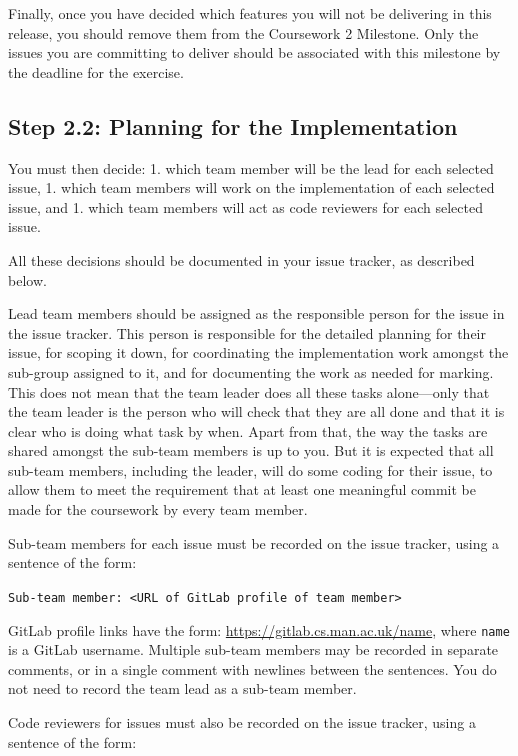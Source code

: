 \documentclass[
]{book}
\begin{document}
Finally, once you have decided which features you will not be delivering in this release, you should remove them from the Coursework 2 Milestone. Only the issues you are committing to deliver should be associated with this milestone by the deadline for the exercise.

\hypertarget{plimp}{%
\subsection{Step 2.2: Planning for the Implementation}\label{plimp}}

You must then decide:
1. which team member will be the lead for each selected issue,
1. which team members will work on the implementation of each selected issue, and
1. which team members will act as code reviewers for each selected issue.

All these decisions should be documented in your issue tracker, as described below.

Lead team members should be assigned as the responsible person for the issue in the issue tracker. This person is responsible for the detailed planning for their issue, for scoping it down, for coordinating the implementation work amongst the sub-group assigned to it, and for documenting the work as needed for marking. This does not mean that the team leader does all these tasks alone---only that the team leader is the person who will check that they are all done and that it is clear who is doing what task by when. Apart from that, the way the tasks are shared amongst the sub-team members is up to you. But it is expected that all sub-team members, including the leader, will do some coding for their issue, to allow them to meet the requirement that at least one meaningful commit be made for the coursework by every team member.

Sub-team members for each issue must be recorded on the issue tracker, using a sentence of the form:

\texttt{Sub-team\ member:\ \textless{}URL\ of\ GitLab\ profile\ of\ team\ member\textgreater{}}

GitLab profile links have the form: \url{https://gitlab.cs.man.ac.uk/name}, where \texttt{name} is a GitLab username. Multiple sub-team members may be recorded in separate comments, or in a single comment with newlines between the sentences. You do not need to record the team lead as a sub-team member.

Code reviewers for issues must also be recorded on the issue tracker, using a sentence of the form:
\end{document}
